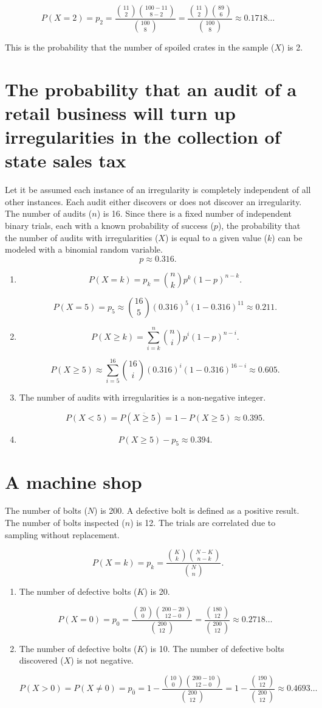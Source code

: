 \documentclass[12pt]{article}
\begin{document}
\[P(X=2)=p_2=\frac{\binom{11}{2}\binom{100-11}{8-2}}{\binom{100}{8}}=\frac{\binom{11}{2}\binom{89}{6}}{\binom{100}{8}}\approx 0.1718\dots\]

This is the probability that the number of spoiled crates in the sample ($X$) is 2.
\section{The probability that an audit of a retail business will turn up irregularities in the collection of state sales tax}
Let it be assumed each instance of an irregularity is completely independent of all other instances. Each audit either discovers or  does not discover an irregularity. The number of audits ($n$) is 16. Since there is a fixed number of independent binary trials, each with a known probability of success ($p$), the probability that the number of audits with irregularities ($X$) is equal to a given value ($k$) can be modeled with a binomial random variable.
\[p\approx 0.316.\]

\begin{enumerate}
\item
\[P(X=k)=p_k=\binom{n}{k}p^k(1-p)^{n-k}.\]

\[P(X=5)=p_5\approx\binom{16}{5}(0.316)^5(1-0.316)^{11}\approx 0.211.\]
\item
\[P(X\geq k)=\sum^n_{i=k}{\binom{n}{i}p^i(1-p)^{n-i}}.\]

\[P(X\geq 5)\approx\sum^{16}_{i=5}{\binom{16}{i}(0.316)^i(1-0.316)^{16-i}}\approx 0.605.\]
\item
The number of audits with irregularities is a non-negative integer.

\[P(X<5)=P(\overline{X\geq 5})=1-P(X\geq 5)\approx 0.395.\]
\item \[P(X\geq 5)-p_5\approx 0.394.\]
\end{enumerate}
\section{A machine shop}
The number of bolts ($N$) is 200. A defective bolt is defined as a positive result. The number of bolts inspected ($n$) is 12. The trials are correlated due to sampling without replacement. 

\[P(X=k)=p_k=\frac{\binom{K}{k}\binom{N-K}{n-k}}{\binom{N}{n}}.\]

\begin{enumerate}
\item
The number of defective bolts ($K$) is 20.

\[P(X=0)=p_0=\frac{\binom{20}{0}\binom{200-20}{12-0}}{\binom{200}{12}}=\frac{\binom{180}{12}}{\binom{200}{12}}\approx 0.2718\dots\]
\item
The number of defective bolts ($K$) is 10. The number of defective bolts discovered ($X$) is not negative.

\[P(X>0)=P(X\neq 0)=p_{\bar{0}}=1-\frac{\binom{10}{0}\binom{200-10}{12-0}}{\binom{200}{12}}=1-\frac{\binom{190}{12}}{\binom{200}{12}}\approx 0.4693\dots\]
\end{enumerate}
\end{document}
